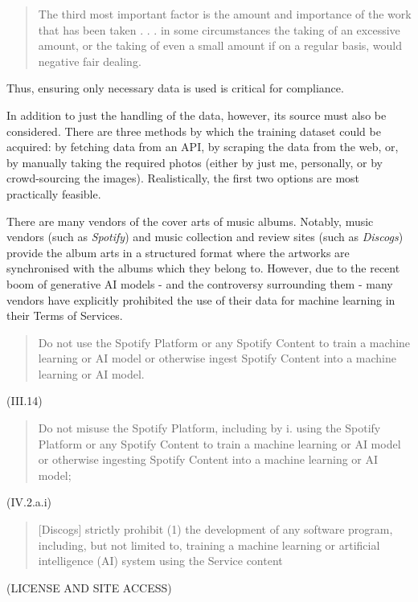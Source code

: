                   \begin{quote}
                      The third most important factor is the amount and importance of the work that has been taken . . . in some circumstances the taking of an excessive amount, or the taking of even a small amount if on a regular basis, would negative fair dealing. \cite{tmlocad}
                  \end{quote}
    
                  Thus, ensuring only necessary data is used is critical for compliance.
    
                  In addition to just the handling of the data, however, its source must also be considered. There are three methods by which the training dataset could be acquired: by fetching data from an API, by scraping the data from the web, or, by manually taking the required photos (either by just me, personally, or by crowd-sourcing the images). Realistically, the first two options are most practically feasible.
    
                  There are many vendors of the cover arts of music albums. Notably, music vendors (such as \textit{Spotify}) and music collection and review sites (such as \textit{Discogs}) provide the album arts in a structured format where the artworks are synchronised with the albums which they belong to. However, due to the recent boom of generative AI models - and the controversy surrounding them \cite{apnews2025mccartney_ai_warning} - many vendors have explicitly prohibited the use of their data for machine learning in their Terms of Services.
    
                  \begin{quote}
                      Do not use the Spotify Platform or any Spotify Content to train a machine learning or AI model or otherwise ingest Spotify Content into a machine learning or AI model.
                  \end{quote} \cite{spotifyDevPolicy} (III.14)
                  \begin{quote}
                      Do not misuse the Spotify Platform, including by i. using the Spotify Platform or any Spotify Content to train a machine learning or AI model or otherwise ingesting Spotify Content into a machine learning or AI model;
                  \end{quote} \cite{spotifyDevTerms} (IV.2.a.i)
                  \begin{quote}
                      [Discogs] strictly prohibit (1) the development of any software program, including, but not limited to, training a machine learning or artificial intelligence (AI) system using the Service content
                  \end{quote} \cite{discogsToS} (LICENSE AND SITE ACCESS)
    
